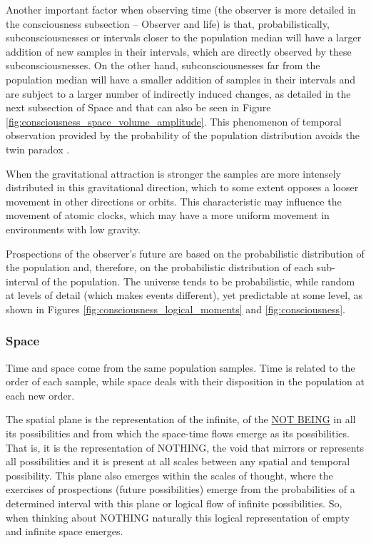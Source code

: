 Another important factor when observing time (the observer is more detailed in the consciousness subsection – Observer and life) is that, probabilistically, subconsciousnesses or intervals closer to the population median will have a larger addition of new samples in their intervals, which are directly observed by these subconsciousnesses. On the other hand, subconsciousnesses far from the population median will have a smaller addition of samples in their intervals and are subject to a larger number of indirectly induced changes, as detailed in the next subsection of Space and that can also be seen in Figure \ref{fig:consciousness_space_volume_amplitude}.  This phenomenon of temporal observation provided by the probability of the population distribution avoids the twin paradox \cite{twin_paradox}.

When the gravitational attraction is stronger the samples are more intensely distributed in this gravitational direction, which to some extent opposes a looser movement in other directions or orbits. This characteristic may influence the movement of atomic clocks, which may have a more uniform movement in environments with low gravity.

Prospections of the observer's future are based on the probabilistic distribution of the population and, therefore, on the probabilistic distribution of each sub-interval of the population. The universe tends to be probabilistic, while random at levels of detail (which makes events different), yet predictable at some level, as shown in Figures \ref{fig:consciousness_logical_moments} and \ref{fig:consciousness}. 

\subsubsection{Space}
Time and space come from the same population samples. Time is related to the order of each sample, while space deals with their disposition in the population at each new order.

The spatial plane is the representation of the infinite, of the \underline{NOT BEING} in all its possibilities and from which the space-time flows emerge as its possibilities. That is, it is the representation of NOTHING, the void that mirrors or represents all possibilities and it is present at all scales between any spatial and temporal possibility. This plane also emerges within the scales of thought, where the exercises of prospections (future possibilities) emerge from the probabilities of a determined interval with this plane or logical flow of infinite possibilities. So, when thinking about NOTHING naturally this logical representation of empty and infinite space emerges.

